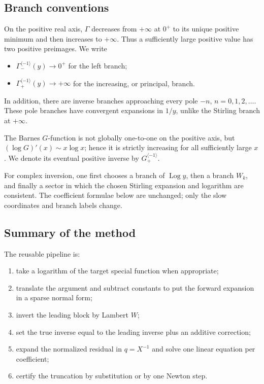 \documentclass[11pt,a4paper]{article}
\numberwithin{equation}{section}
\theoremstyle{definition}
\theoremstyle{remark}
\newcommand{\cinv}{\langle-1\rangle}
\newcommand{\Log}{\operatorname{Log}}
\begin{document}
\subsection{Branch conventions}

On the positive real axis, \(\Gamma\) decreases from \(+\infty\) at
\(0^+\) to its unique positive minimum and then increases to
\(+\infty\).  Thus a sufficiently large positive value has two positive
preimages.  We write
\begin{itemize}
\item \(\Gamma_-^{\cinv}(y)\to0^+\) for the left branch;
\item \(\Gamma_+^{\cinv}(y)\to+\infty\) for the increasing, or principal,
      branch.
\end{itemize}
In addition, there are inverse branches approaching every pole
\(-n\), \(n=0,1,2,\ldots\).  These pole branches have convergent expansions
in \(1/y\), unlike the Stirling branch at \(+\infty\).

The Barnes \(G\)-function is not globally one-to-one on the positive axis,
but \((\log G)'(x)\sim x\log x\); hence it is strictly increasing for all
sufficiently large \(x\).  We denote its eventual positive inverse by
\(G_+^{\cinv}\).

For complex inversion, one first chooses a branch of \(\Log y\), then a
branch \(W_k\), and finally a sector in which the chosen Stirling expansion
and logarithm are consistent.  The coefficient formulae below are
unchanged; only the slow coordinates and branch labels change.

\subsection{Summary of the method}

The reusable pipeline is:
\begin{enumerate}
\item take a logarithm of the target special function when appropriate;
\item translate the argument and subtract constants to put the forward
      expansion in a sparse normal form;
\item invert the leading block by Lambert \(W\);
\item set the true inverse equal to the leading inverse plus an additive
      correction;
\item expand the normalized residual in \(q=X^{-1}\) and solve one linear
      equation per coefficient;
\item certify the truncation by substitution or by one Newton step.
\end{enumerate}
\end{document}
